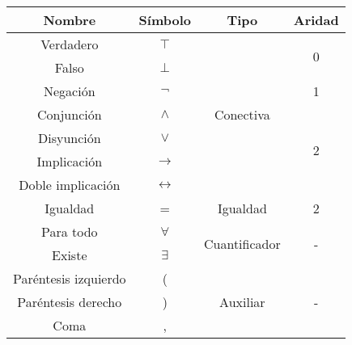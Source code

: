 \begin{table}[H]
	\centering
	\begin{tabular}{|c|c|c|c|}
		\hline
		\textbf{Nombre}      & \textbf{Símbolo}    & \textbf{Tipo}                  & \textbf{Aridad}    \\ \hline
		Verdadero            & \(\top\)            & \multirow{7}{*}{Conectiva}     & \multirow{2}{*}{0} \\ \cline{1-2}
		Falso                & \(\perp\)           &                                &                    \\ \cline{1-2} \cline{4-4}
		Negación             & \(\neg\)            &                                & 1                  \\ \cline{1-2} \cline{4-4}
		Conjunción           & \(\wedge\)          &                                & \multirow{4}{*}{2} \\ \cline{1-2}
		Disyunción           & \(\vee\)            &                                &                    \\ \cline{1-2}
		Implicación          & \(\rightarrow\)     &                                &                    \\ \cline{1-2}
		Doble implicación    & \(\leftrightarrow\) &                                &                    \\ \hline
		Igualdad             & =                   & Igualdad                       & 2                  \\ \hline
		Para todo            & \(\forall\)         & \multirow{2}{*}{Cuantificador} & \multirow{2}{*}{-} \\ \cline{1-2}
		Existe               & \(\exists\)         &                                &                    \\ \hline
		Paréntesis izquierdo & (                   & \multirow{3}{*}{Auxiliar}      & \multirow{3}{*}{-} \\ \cline{1-2}
		Paréntesis derecho   & )                   &                                &                    \\ \cline{1-2}
		Coma                 & ,                   &                                &                    \\ \hline
	\end{tabular}
\end{table}


